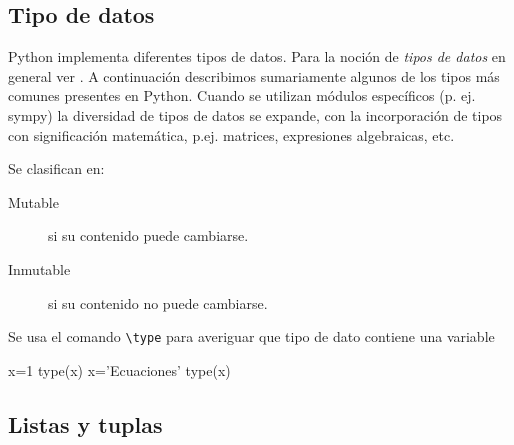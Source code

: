\subsection{Tipo de datos}

Python implementa diferentes tipos de datos. Para la noción de \emph{tipos de datos} en 
general 
ver \cite{wiki:tipo_dato}. A continuación describimos sumariamente algunos de los tipos 
más comunes presentes en Python. Cuando se utilizan módulos específicos (p. ej. sympy) la 
diversidad  de tipos de datos se expande, con la incorporación de tipos con significación
matemática, p.ej. matrices,  expresiones algebraicas, etc. 



Se clasifican en:
\begin{description}
 \item[Mutable] si su contenido puede cambiarse.
 \item[Inmutable] si su contenido no puede cambiarse.
\end{description}

Se usa el comando \verb~\type~ para averiguar que tipo de dato contiene una variable

 \begin{pyconsole}
x=1
type(x)
x='Ecuaciones'
type(x)
\end{pyconsole}





\subsection{Listas y tuplas}


